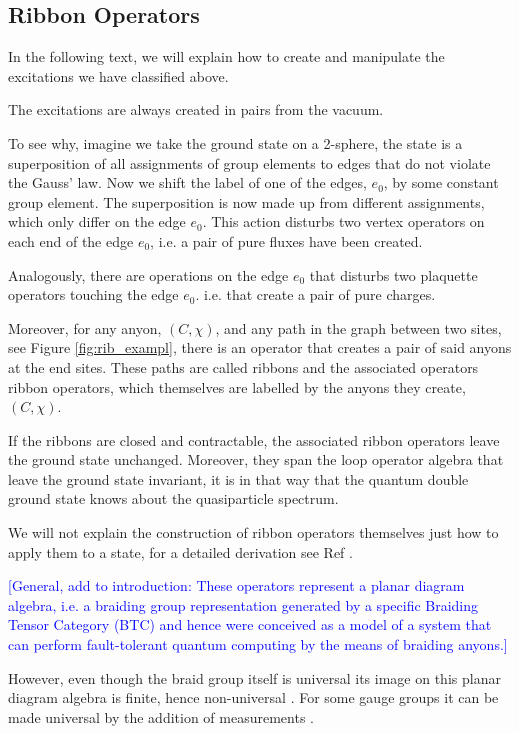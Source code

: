 \documentclass[two column]{article}
\newcommand{\jovan}[1]{\textcolor{blue}{[#1]}}
\begin{document}
\subsection{Ribbon Operators}

In the following text, we will explain how to create and manipulate the excitations we have classified above.

The excitations are always created in pairs from the vacuum. 

To see why, imagine we take the ground state on a 2-sphere, the state is a superposition of all assignments of group elements to edges that do not violate the Gauss' law. Now we shift the label of one of the edges, $e_0$, by some constant group element. The superposition is now made up from different assignments, which only differ on the edge $e_0$. This action disturbs two vertex operators on each end of the edge $e_0$, i.e. a pair of pure fluxes have been created.

Analogously, there are operations on the edge $e_0$ that disturbs two plaquette operators touching the edge $e_0$. i.e. that create a pair of pure charges.

Moreover, for any anyon, $(C, \chi)$, and any path in the graph between two sites, see Figure \ref{fig:rib_exampl}, there is an operator that creates a pair of said anyons at the end sites. These paths are called ribbons and the associated operators ribbon operators, which themselves are labelled by the anyons they create, $(C, \chi)$.

If the ribbons are closed and contractable, the associated ribbon operators leave the ground state unchanged. Moreover, they span the loop operator algebra that leave the ground state invariant, it is in that way that the quantum double ground state knows about the quasiparticle spectrum.

We will not explain the construction of ribbon operators themselves just how to apply them to a state, for a detailed derivation see Ref \cite{Kitaev_2003,cui2018topological}. 

\jovan{General, add to introduction: These operators represent a planar diagram algebra, i.e. a braiding group representation generated by a specific Braiding Tensor Category (BTC) and hence were conceived as a model of a system that can perform fault-tolerant quantum computing by the means of braiding anyons.} 

However, even though the braid group itself is universal its image on this planar diagram algebra is finite, hence non-universal \cite{cui2018topological}. For some gauge groups it can be made universal by the addition of measurements \cite{Cui_2015}.
\end{document}

